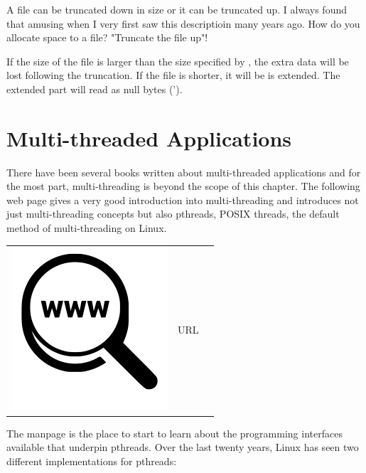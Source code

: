 A file can be truncated down in size or it can be truncated up. I always found that amusing when I very first saw this descriptioin many years ago. How do you allocate space to a file? "Truncate the file up"!

If the size of the file is larger than the size specified by , the extra data will be lost following the truncation.  If the file is shorter, it will be is extended. The extended part will read as null bytes (').


\section{Multi-threaded Applications}

There have been several books written about multi-threaded applications and for the most part, multi-threading is beyond the scope of this chapter. The following web page gives a very good introduction into multi-threading and introduces not just multi-threading concepts but also pthreads, POSIX threads, the default method of multi-threading on Linux.

\begin{table}[h]
\begin{tabular}{lcl}
\parbox[r]{0.5in}{\includegraphics[scale=0.15]{figures/url.png}} & \parbox[l]{0.55in}{URL } & \parbox[l]{3in}{}
\end{tabular}
\end{table}

\noindent
The  manpage is the place to start to learn about the programming interfaces available that underpin pthreads. Over the last twenty years, Linux has seen two different implementations for pthreads:

